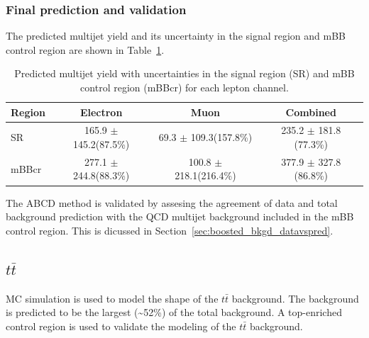 %
%
\subsubsection{Final prediction and validation}
\label{sec:boosted_bkgd_qcdmultijet_predict_valid}
 
The predicted multijet yield and its uncertainty in the signal region and mBB control region are
shown in Table~\ref{tab:boosted_syst_qcd_norm_unc}.
 
\begin{table}[!htbp]
\begin{center}
\begin{tabular}{l|c|c|c}
Region    & Electron                   & Muon                       & Combined                   \\  
\hline
SR        & 165.9 $\pm$ 145.2(87.5\%) & 69.3 $\pm$ 109.3(157.8\%)   & 235.2 $\pm$ 181.8 (77.3\%) \\
mBBcr     & 277.1 $\pm$ 244.8(88.3\%) & 100.8 $\pm$ 218.1(216.4\%)  & 377.9 $\pm$ 327.8 (86.8\%) \\
\hline
\end{tabular}
\end{center}
\caption[Predicted multijet yield in the SR and mBBcr]{Predicted multijet yield with uncertainties in the signal region (SR) and mBB control region (mBBcr)
for each lepton channel.}
\label{tab:boosted_syst_qcd_norm_unc}
\end{table}
 
The ABCD method is validated by assesing the agreement of data and total background prediction with the QCD multijet background included
in the mBB control region. This is dicussed in Section~\ref{sec:boosted_bkgd_datavspred}.
 
%
%
\subsection{$t\bar{t}$}
\label{sec:boosted_bkgd_ttbar}
 
MC simulation is used to model the shape of the $t\bar{t}$ background. The background
is predicted to be the largest (\textasciitilde 52\%) of the total background. A top-enriched control region
is used to validate the modeling of the $t\bar{t}$ background.%
 
